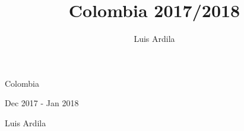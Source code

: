 \documentclass[10pt,final,openany]{book}
\title{Colombia 2017/2018}
\author{Luis Ardila}
\begin{document}
\pagestyle{empty}

\vspace*{5cm}

\begin{center}

{\Huge Colombia}

\vspace{\baselineskip}

{\LARGE Dec 2017 - Jan 2018}

\vspace{\baselineskip}

{\Large Luis Ardila }

\end{center}

\newpage
\thispagestyle{empty}
\mbox{}

\addtocounter{page}{-2}%

\pagestyle{plain}

\captionsetup[figure]{labelformat=empty}

\newpage


\end{document}

